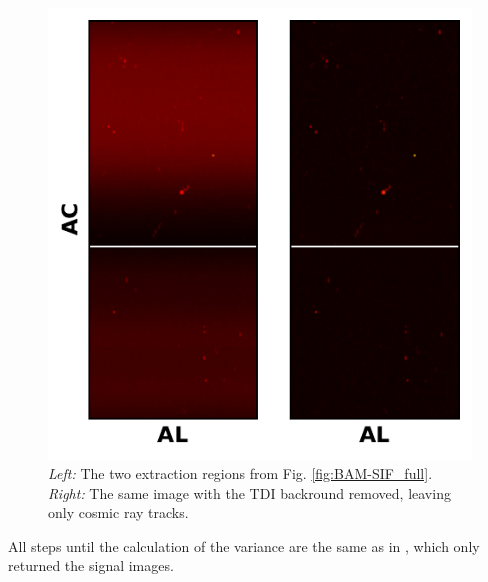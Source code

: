\documentclass[a4paper, 11pt]{article}
\begin{document}
\begin{figure}
  \centering
  \includegraphics{images/extraction/BAM-SIF_background}
  \caption{\textit{Left:} The two extraction regions from Fig. \ref{fig:BAM-SIF_full}. \textit{Right:} The same image with the TDI backround removed, leaving only cosmic ray tracks.}
  \label{fig:BAM-SIF_background}
\end{figure}

All steps until the calculation of the variance are the same as in \cite{GAIA-DE-TN-ESAC-RKO-033}, which only returned the signal images.
\end{document}
